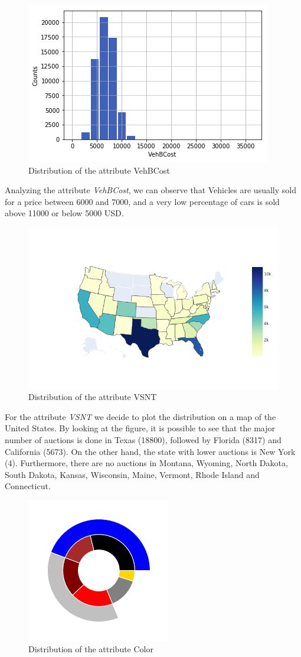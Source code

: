 \documentclass{article}
\begin{document}
	\begin{figure}[H]
		\centering
		\includegraphics[width=.4\textwidth]{hist}\hfill
		\caption{Distribution of the attribute VehBCost}
	\end{figure}
	Analyzing the attribute \emph{VehBCost}, we can observe that Vehicles are usually sold for a price between 6000 and 7000, and a very low percentage of cars is sold above 11000 or below 5000 USD. 
	
	
	\begin{figure}[H]
		\centering
		\includegraphics[width=.6\textwidth, height=.6\textheight, keepaspectratio]{newplot.png}
		\caption{{ Distribution of the attribute VSNT}}
	\end{figure}
	
	
	For the attribute \emph{VSNT} we decide to plot the distribution on a map of the United States. By looking at the figure, it is possible to see that the major number of auctions is done in Texas (18800), followed by Florida (8317) and California (5673). On the other hand, the state with lower auctions is New York (4). Furthermore, there are no auctions in Montana, Wyoming, North Dakota, South Dakota, Kansas, Wisconsin, Maine, Vermont, Rhode Island and Connecticut.
	\begin{figure}[H]
		\centering
		\includegraphics[width=.4\textwidth]{color.png}
		\caption{Distribution of the attribute Color}
		\label{fig:color}
	\end{figure}
	
\end{document}
